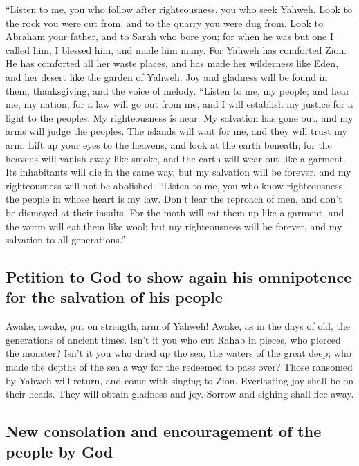  ``Listen to me, you who follow after righteousness, you
who seek Yahweh. Look to the rock you were cut from, and to the quarry
you were dug from.  Look to Abraham your father, and to
Sarah who bore you; for when he was but one I called him, I blessed him,
and made him many.  For Yahweh has comforted Zion. He has
comforted all her waste places, and has made her wilderness like Eden,
and her desert like the garden of Yahweh. Joy and gladness will be found
in them, thanksgiving, and the voice of melody.  ``Listen
to me, my people; and hear me, my nation, for a law will go out from me,
and I will establish my justice for a light to the peoples.
 My righteousness is near. My salvation has gone out, and
my arms will judge the peoples. The islands will wait for me, and they
will trust my arm.  Lift up your eyes to the heavens, and
look at the earth beneath; for the heavens will vanish away like smoke,
and the earth will wear out like a garment. Its inhabitants will die in
the same way, but my salvation will be forever, and my righteousness
will not be abolished.  ``Listen to me, you who know
righteousness, the people in whose heart is my law. Don't fear the
reproach of men, and don't be dismayed at their insults. 
For the moth will eat them up like a garment, and the worm will eat them
like wool; but my righteousness will be forever, and my salvation to all
generations.''

\hypertarget{petition-to-god-to-show-again-his-omnipotence-for-the-salvation-of-his-people}{%
\subsection{Petition to God to show again his omnipotence for the
salvation of his
people}\label{petition-to-god-to-show-again-his-omnipotence-for-the-salvation-of-his-people}}

 Awake, awake, put on strength, arm of Yahweh! Awake, as
in the days of old, the generations of ancient times. Isn't it you who
cut Rahab in pieces, who pierced the monster?  Isn't it
you who dried up the sea, the waters of the great deep; who made the
depths of the sea a way for the redeemed to pass over? 
Those ransomed by Yahweh will return, and come with singing to Zion.
Everlasting joy shall be on their heads. They will obtain gladness and
joy. Sorrow and sighing shall flee away.

\hypertarget{new-consolation-and-encouragement-of-the-people-by-god}{%
\subsection{New consolation and encouragement of the people by
God}\label{new-consolation-and-encouragement-of-the-people-by-god}}

